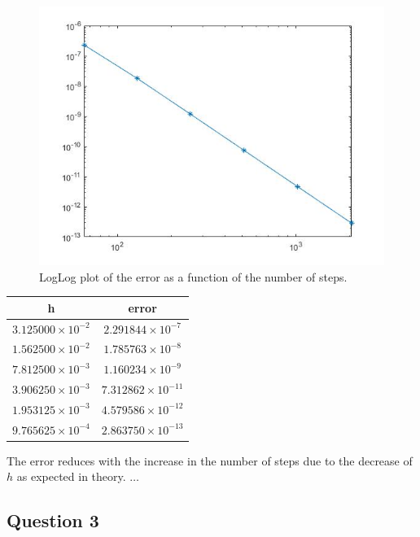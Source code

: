 \documentclass[a4paper, 11pt]{article}
\begin{document}
	\begin{figure}[H]
		\centering
		\includegraphics[width=\linewidth]{ex2.jpg}
		\caption{LogLog plot of the error as a function of the number of steps.}
		\label{fig:ex2}
	\end{figure}
	
	\begin{table}[H]
		\centering
		\begin{tabular}{c|c}
			\textbf{h}& \textbf{error}   \\ \hline
			$ 3.125000\times 10^{-2} $ & $ 2.291844\times 10^{-7} $ \\ \hline
			$ 1.562500\times 10^{-2} $ & $ 1.785763\times 10^{-8} $ \\ \hline
			$ 7.812500\times 10^{-3} $ & $ 1.160234\times 10^{-9} $ \\ \hline
			$ 3.906250\times 10^{-3} $ & $ 7.312862\times 10^{-11} $ \\ \hline
			$ 1.953125\times 10^{-3} $ & $ 4.579586\times 10^{-12} $ \\ \hline
			$ 9.765625\times 10^{-4} $ & $ 2.863750\times 10^{-13} $ \\ \hline
		\end{tabular}
	\end{table}
	
	The error reduces with the increase in the number of steps due to the decrease of $h$ as expected in theory. $\ldots$		
	
	\subsection*{Question 3}
	
\end{document}

